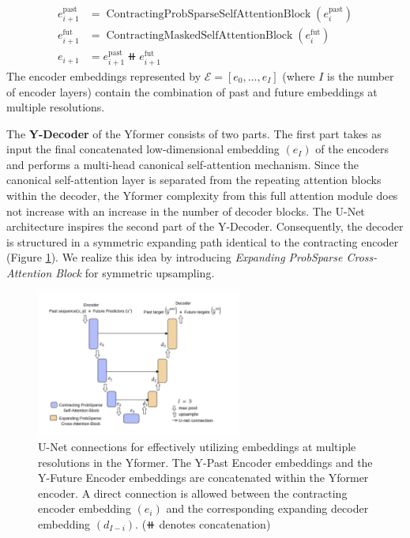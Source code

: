 \begin{equation}
\begin{aligned}
    e^{\text{past}}_{i+1} &= \operatorname{ContractingProbSparseSelfAttentionBlock}(e^{\text{past}}_{i}) \\
    e^{\text{fut}}_{i+1} &= \operatorname{ContractingMaskedSelfAttentionBlock}(e^{\text{fut}}_{i}) \\
    e_{i+1} &= e^{\text{past}}_{i+1} \doubleplus e^{\text{fut}}_{i+1}
    \label{Eq:concatencoders}
\end{aligned}
\end{equation}
The encoder embeddings represented by $\mathcal{E} = [e_0, \dots, e_{I}]$ (where $I$ is the number of encoder layers) contain the combination of past and future embeddings at multiple resolutions.

The \textbf{Y-Decoder} of the Yformer consists of two parts. The first part takes as input the final concatenated low-dimensional embedding $(e_I)$ of the encoders and performs a multi-head canonical self-attention mechanism. Since the canonical self-attention layer is separated from the repeating attention blocks within the decoder, the Yformer complexity from this full attention module does not increase with an increase in the number of decoder blocks. The U-Net architecture inspires the second part of the Y-Decoder. Consequently, the decoder is structured in a symmetric expanding path identical to the contracting encoder (Figure \ref{fig:unet}). We realize this idea by introducing  \textsl{Expanding ProbSparse Cross-Attention Block} for symmetric upsampling.

\begin{figure}[t]
 \centering
 \includegraphics[width=0.6\textwidth]{figs/unet_yformer.png}
 \caption{U-Net connections for effectively utilizing embeddings at multiple resolutions in the Yformer. The 
 Y-Past Encoder embeddings and the Y-Future Encoder embeddings are concatenated within the Yformer encoder. A direct connection is allowed between the contracting encoder embedding $(e_i)$ and the corresponding expanding decoder embedding $(d_{I-i})$. ($\doubleplus$ denotes concatenation) }
 \label{fig:unet}
\end{figure}

